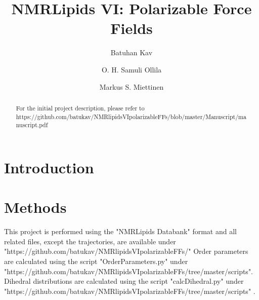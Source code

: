 \documentclass[journal=jacsat,manuscript=article,layout=singlecolumn]{achemso}
\author{Batuhan Kav}
\affiliation{Forschungszentrum Juelich, Germany}
\author{O. H. Samuli Ollila}
\author{Markus S. Miettinen}
\title{NMRLipids VI: Polarizable Force Fields}
\begin{document}


\begin{abstract}
	
	For the initial project description, please refer to \\ https://github.com/batukav/NMRlipidsVIpolarizableFFs/blob/master/Manuscript/manuscript.pdf
	
\end{abstract}

\section{Introduction}

\section{Methods}

This project is performed using the "NMRLipids Databank" format and all related files, except the trajectories, are available under\\ "https://github.com/batukav/NMRlipidsVIpolarizableFFs/"
Order parameters are calculated using the script "OrderParameters.py" under\\ "https://github.com/batukav/NMRlipidsVIpolarizableFFs/tree/master/scripts". \\
Dihedral distributions are calculated using the script "calcDihedral.py" under\\ "https://github.com/batukav/NMRlipidsVIpolarizableFFs/tree/master/scripts" .\\
\end{document}
